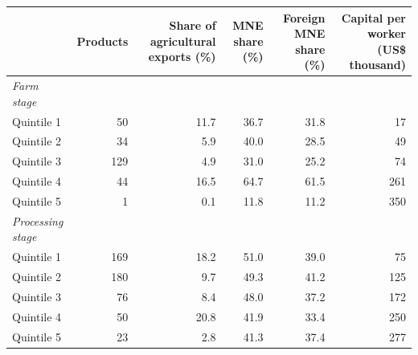 \begin{tabular}{lrrrrr}
\toprule
 & Products & Share of agricultural exports (\%) & MNE share (\%) & Foreign MNE share (\%) & Capital per worker (US\$ thousand) \\
\midrule
\textit{Farm stage} &  &  &  &  &  \\
Quintile 1 & 50 & 11.7 & 36.7 & 31.8 & 17 \\
Quintile 2 & 34 & 5.9 & 40.0 & 28.5 & 49 \\
Quintile 3 & 129 & 4.9 & 31.0 & 25.2 & 74 \\
Quintile 4 & 44 & 16.5 & 64.7 & 61.5 & 261 \\
Quintile 5 & 1 & 0.1 & 11.8 & 11.2 & 350 \\
\textit{Processing stage} &  &  &  &  &  \\
Quintile 1 & 169 & 18.2 & 51.0 & 39.0 & 75 \\
Quintile 2 & 180 & 9.7 & 49.3 & 41.2 & 125 \\
Quintile 3 & 76 & 8.4 & 48.0 & 37.2 & 172 \\
Quintile 4 & 50 & 20.8 & 41.9 & 33.4 & 250 \\
Quintile 5 & 23 & 2.8 & 41.3 & 37.4 & 277 \\
\bottomrule
\end{tabular}
